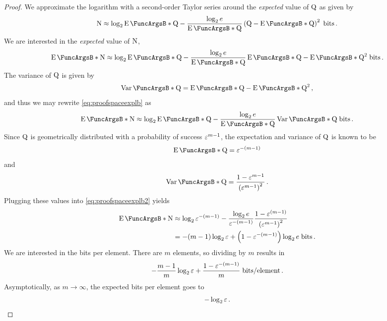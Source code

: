 \documentclass[ ../main.tex]{subfiles}
\begin{document}
\begin{proof}
We approximate the logarithm with a second-order Taylor series around the \emph{expected} value of $\RV{Q}$ as given by
\begin{equation}
    \RV{N} \approx
        \log_2 \Expect{\RV{Q}} -
        \frac{\log_2 e}{\Expect{\RV{Q}}}
        \left(\RV{Q} - \Expect{\RV{Q}}\right)^2 \; \si{bits}\,.
\end{equation}
We are interested in the \emph{expected} value of $\RV{N}$,
\begin{equation}
\label{eq:proofspaceexplb}
    \Expect{\RV{N}} \approx
        \log_2 \Expect{\RV{Q}} -
        \frac{\log_2 e}{\Expect{\RV{Q}}}
        \Expect{\RV{Q} - \Expect{\RV{Q}}}^2 \; \si{bits}\,.
\end{equation}
The variance of $\RV{Q}$ is given by
\begin{equation}
    \Var{\RV{Q}} = \Expect{\RV{Q} - \Expect{\RV{Q}}}^2\,,
\end{equation}
and thus we may rewrite \cref{eq:proofspaceexplb} as
\begin{equation}
\label{eq:proofspaceexplb2}
    \Expect{\RV{N}} \approx
        \log_2 \Expect{\RV{Q}} -
        \frac{\log_2 e}{\Expect{\RV{Q}}}
        \Var{\RV{Q}} \; \si{bits}\,.
\end{equation}
Since $\RV{Q}$ is geometrically distributed with a probability of success $\fprate^{m-1}$, the expectation and variance of $\RV{Q}$ is known to be
\begin{equation}
    \Expect{\RV{Q}} = \fprate^{-(m-1)}
\end{equation}
and 
\begin{equation}
    \Var{\RV{Q}} = \frac{1 - \fprate^{m-1}}{\left(\fprate^{m-1}\right)^2}\,.
\end{equation}
Plugging these values into \cref{eq:proofspaceexplb2} yields
\begin{align}
    \Expect{\RV{N}}
        &\approx \log_2 \fprate^{-(m-1)} - \frac{\log_2 e}{\fprate^{-(m-1)}} \frac{1 - \fprate^{(m-1)}}{\left(\fprate^{m-1}\right)^2}\\
        &= -(m-1) \log_2 \fprate + \left(1 - \fprate^{-(m-1)}\right) \log_2 e \; \si{bits}\,.
\end{align}
We are interested in the bits per element. There are $m$ elements, so dividing by $m$ results in
\begin{equation}
    -\frac{m-1}{m} \log_2 \fprate + \frac{1 - \fprate^{-(m-1)}}{m} \; \si{bits \per element}\,.
\end{equation}
Asymptotically, as $m \to \infty$, the expected bits per element goes to
\begin{equation}
    -\log_2 \fprate\,.
\end{equation}
\end{proof}
\end{document}
